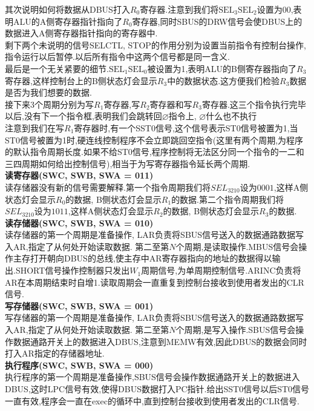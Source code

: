 \documentclass[UTF8]{ctexart}
\begin{document}
\indent 其次说明如何将数据从DBUS打入$R_0$寄存器.注意到我们将$\text{SEL}_{3}\text{SEL}_{2}$设置为00,表明ALU的A侧寄存器指针指向了$R_0$寄存器,同时SBUS的DRW信号会使DBUS上的数据进入A侧寄存器指针指向的寄存器中.\\
剩下两个未说明的信号SELCTL, STOP的作用分别为设置当前指令有控制台操作,指令运行以后暂停.以后所有指令中这两个信号都是同一含义.\\
\indent 最后是一个无关紧要的细节.$\text{SEL}_{1}\text{SEL}_{0}$被设置为1,表明ALU的B侧寄存器指向了$R_3$寄存器,这样控制台上的B侧状态灯会显示$R_3$中的数据状态.这方便我们检验$R_3$数据是否为我们想要的数据.\\
\indent 接下来3个周期分别为写$R_1$寄存器,写$R_2$寄存器和写$R_3$寄存器.这三个指令执行完毕以后,没有下一个指令框,表明我们会跳转回$\varnothing$指令上, $\varnothing$什么也不执行\\
\indent 注意到我们在写$R_1$寄存器时,有一个SST0信号,这个信号表示ST0信号被置为1,当ST0信号被置为1时,硬连线控制程序不会立即跳回空指令(这里有两个周期,为程序的默认指令周期长度.如果不给ST0信号,程序控制将无法区分同一个指令的一二和三四周期如何给出控制信号),相当于为写寄存器指令延长两个周期.\\
{\bfseries 读寄存器(SWC, SWB, SWA = 011)}\\
\indent 读存储器没有新的信号需要解释.第一个指令周期我们将$SEL_{3210}$设为$0001$,这样A侧状态灯会显示$R_0$的数据, B侧状态灯会显示$R_1$的数据.第二个指令周期我们将$SEL_{3210}$设为$1011$,这样A侧状态灯会显示$R_2$的数据, B侧状态灯会显示$R_3$的数据.\\
{\bfseries 读存储器(SWC, SWB, SWA = 010)}\\
\indent 读存储器的第一个周期是准备操作, LAR负责将SBUS信号送入的数据通路数据写入AR,指定了从何处开始读取数据. 第二至第$N$个周期,是读取操作.MBUS信号会操作主存打开朝向DBUS的总线,使主存中AR寄存器指向的地址的数据得以输出.SHORT信号操作控制器只发出$W_1$周期信号,为单周期控制信号.ARINC负责将AR在本周期结束时自增1.读取周期会一直重复到控制台接收到使用者发出的CLR信号.\\
{\bfseries 写存储器(SWC, SWB, SWA = 001)}\\
\indent 写存储器的第一个周期是准备操作, LAR负责将SBUS信号送入的数据通路数据写入AR,指定了从何处开始读取数据. 第二至第$N$个周期,是写入操作.SBUS信号会操作数据通路开关上的数据进入DBUS,注意到MEMW有效,因此DBUS的数据会同时打入AR指定的存储器地址.\\
{\bfseries 执行程序(SWC, SWB, SWA = 000)}\\
\indent 执行程序的第一个周期是准备操作,SBUS信号会操作数据通路开关上的数据进入DBUS,这时LPC信号有效,使得DBUS数据打入PC指针.给出SST0信号以后ST0信号一直有效,程序会一直在exec的循环中,直到控制台接收到使用者发出的CLR信号.
\end{document}

